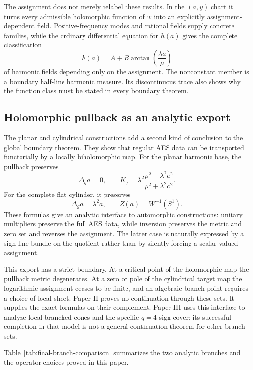 The assignment does not merely relabel these results.  In the $(a,y)$ chart it
turns every admissible holomorphic function of $w$ into an explicitly
assignment-dependent field.  Positive-frequency modes and rational fields supply
concrete families, while the ordinary differential equation for $h(a)$ gives the
complete classification
\[
 h(a)=A+B\arctan\!\left(\frac{\lambda a}{\mu}\right)
\]
of harmonic fields depending only on the assignment.  The nonconstant member is a
boundary half-line harmonic measure.  Its discontinuous trace also shows why the
function class must be stated in every boundary theorem.

\subsection{Holomorphic pullback as an analytic export}

The planar and cylindrical constructions add a second kind of conclusion to the
global boundary theorem.  They show that regular AES data can be transported
functorially by a locally biholomorphic map.  For the planar harmonic base, the
pullback preserves
\[
 \Delta_g a=0,
 \qquad
 K_g=\lambda^2
 \frac{\mu^2-\lambda^2a^2}{\mu^2+\lambda^2a^2}.
\]
For the complete flat cylinder, it preserves
\[
 \Delta_g a=\lambda^2a,
 \qquad
 Z(a)=W^{-1}(S^1).
\]
These formulas give an analytic interface to automorphic constructions: unitary
multipliers preserve the full AES data, while inversion preserves the metric and
zero set and reverses the assignment.  The latter case is naturally expressed by a
sign line bundle on the quotient rather than by silently forcing a scalar-valued
assignment.

This export has a strict boundary.  At a critical point of the holomorphic map the
pullback metric degenerates.  At a zero or pole of the cylindrical target map the
logarithmic assignment ceases to be finite, and an algebraic branch point requires
a choice of local sheet.  Paper II proves no continuation through these sets.  It
supplies the exact formulas on their complement.  Paper III uses this interface to
analyze local branched cones and the specific $q=4$ sign cover; its successful
completion in that model is not a general continuation theorem for other branch
sets\cite{Yuan2026AEGZeroGeometry}.

Table~\ref{tab:final-branch-comparison} summarizes the two analytic branches and the
operator choices proved in this paper.


